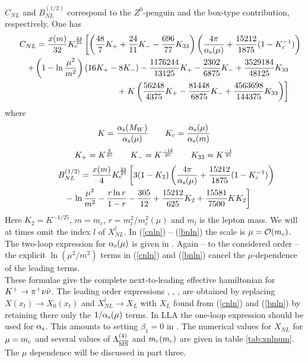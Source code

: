 $C_{NL}$ and $B^{(1/2)}_{NL}$ correspond to the $Z^0$-penguin and the
box-type contribution, respectively. One has \cite{buchallaburas:94}
\begin{eqnarray}\label{cnln}
\lefteqn{C_{NL}={x(m)\over 32}K^{{24\over 25}}_c\left[\left({48\over 7}K_++
 {24\over 11}K_--{696\over 77}K_{33}\right)\left({4\pi\over\as(\mu)}+
 {15212\over 1875} (1-K^{-1}_c)\right)\right.}\nonumber\\
&&+\left(1-\ln{\mu^2\over m^2}\right)(16K_+-8K_-)-{1176244\over 13125}K_+-
 {2302\over 6875}K_-+{3529184\over 48125}K_{33} \nonumber\\
&&+\left. K\left({56248\over 4375}K_+-{81448\over 6875}K_-+{4563698\over 144375}K_{33}
  \right)\right]
\end{eqnarray}
where
\begin{equation}\label{kkc} K={\alpha_{\rm s}(M_W)\over\alpha_{\rm s}(\mu)}\qquad
  K_c={\alpha_{\rm s}(\mu)\over\alpha_{\rm s}(m)}  \end{equation}
\begin{equation}\label{kkn} K_+=K^{{6\over 25}}\qquad K_-=K^{{-12\over 25}}\qquad
          K_{33}=K^{{-1\over 25}}  \end{equation}
\begin{eqnarray}\label{bnln}
\lefteqn{B^{(1/2)}_{NL}={x(m)\over 4}K^{24\over 25}_c\left[ 3(1-K_2)\left(
 {4\pi\over\as(\mu)}+{15212\over 1875}(1-K^{-1}_c)\right)\right.}\nonumber\\
&&-\left.\ln{\mu^2\over m^2}-
  {r\ln r\over 1-r}-{305\over 12}+{15212\over 625}K_2+{15581\over 7500}K K_2
  \right]
\end{eqnarray}
Here $K_2=K^{-1/25}$, $m=m_c$, $r=m^2_l/m^2_c(\mu)$ and $m_l$ is the
lepton mass.  We will at times omit the index $l$ of $X^l_{NL}$.  In
(\ref{cnln}) -- (\ref{bnln}) the scale is $\mu={\cal O}(m_c)$.  The
two-loop expression for $\alpha_{\rm s}(\mu)$ is given in .  Again -- to
the considered order -- the explicit $\ln(\mu^2/m^2)$ terms in
(\ref{cnln}) and (\ref{bnln}) cancel the $\mu$-dependence of the
leading terms.
\\
These formulae give the complete next-to-leading effective hamiltonian
for $K^+ \to \pi^+\nu\bar\nu$. The leading order expressions \cite{novikovetal:77},
\cite{ellishagelin:83}, \cite{dibetal:91}, \cite{buchallaetal:91} are
obtained by replacing $X(x_t)\to X_0(x_t)$ and $X^l_{NL}\to X_L$ with
$X_L$ found from (\ref{cnln}) and (\ref{bnln}) by retaining there only
the $1/\alpha_{\rm s}(\mu)$ terms. In LLA the one-loop expression should be used
for $\alpha_{\rm s}$.  This amounts to setting $\beta_1=0$ in .  The
numerical values for $X_{NL}$ for $\mu = m_{\rm c}$ and several values of
$\Lambda_{\overline{\rm MS}}^{(4)}$ and $m_{\rm c}(m_{\rm c})$ are given in table \ref{tab:xnlnum}. The
$\mu$ dependence will be discussed in part three.

